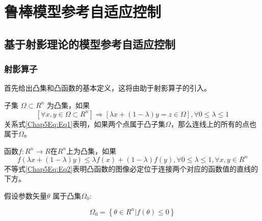 




\section{鲁棒模型参考自适应控制  }


\subsection{基于射影理论的模型参考自适应控制  }

\subsubsection{射影算子}
首先给出凸集和凸函数的基本定义，这将由助于射影算子的引入。

\begin{defn}
子集 $\Omega \subset R^{n}$ 为凸集，如果
\begin{equation}
\label{Chap5Eq:Eq1}
\left[ {\forall x,y \in \Omega  \subset {R^n}} \right] \Rightarrow \left[ {\lambda x + \left( {1 - \lambda } \right)y = z \in \Omega } \right],\forall 0 \le \lambda  \le 1
\end{equation}
关系式{\ref{Chap5Eq:Eq1}}表明，如果两个点属于凸子集$\Omega$，那么连线上的所有的点也属于$\Omega$。
\end{defn}

\begin{defn}
函数$f:R^n \to R$在$R^n$上为凸集，如果
\begin{equation}
\label{Chap5Eq:Eq2}
f\left( {\lambda x + \left( {1 - \lambda } \right)y} \right) \le \lambda f\left( x \right) + \left( {1 - \lambda } \right)f\left( y \right),\forall 0 \le \lambda  \le 1,\forall x,y \in {R^n}
\end{equation}
不等式\ref{Chap5Eq:Eq2}表明凸函数的图像必定位于连接两个对应的函数值的直线的下方。
\end{defn}


假设参数矢量$\theta$ 属于凸集$\Omega_0$:

\begin{equation}
\Omega _0= \left \{    \theta \in R^n | f(\theta) \leqslant  0  \right \}
\end{equation}

